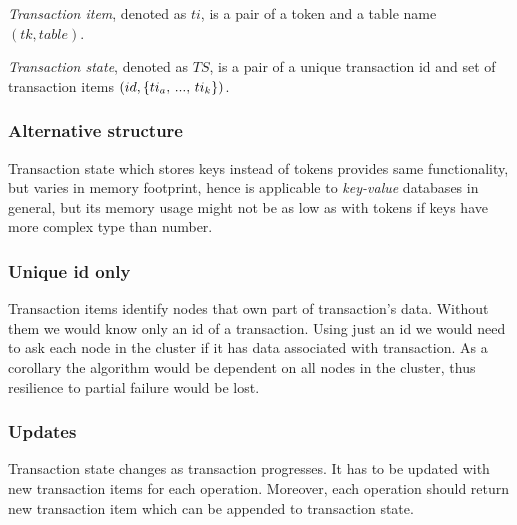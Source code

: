 \begin{definition}
  \label{def:transactionItem}
  \emph{Transaction item}, denoted as $ti$, is a pair of a token and a table name $(tk,table)$.
\end{definition}

\begin{definition}
  \label{def:transactionState}
  \emph{Transaction state}, denoted as $TS$, is a pair of a unique transaction id and set of transaction items $(id, \{ \text{$ti_{a}$, ..., $ti_{k}$} \})$.
\end{definition}

\subsubsection{Alternative structure}
Transaction state which stores keys instead of tokens provides same functionality, but varies in memory footprint, hence \mpt is applicable to \emph{key-value} databases in general, but its memory usage might not be as low as with tokens if keys have more complex type than number.

\subsubsection{Unique id only}
Transaction items identify nodes that own part of transaction's data. Without them we would know only an id of a transaction.
Using just an id we would need to ask each node in the cluster if it has data associated with transaction. As a corollary the algorithm would be dependent on all nodes in the cluster, thus resilience to partial failure would be lost.

\subsubsection{Updates}
Transaction state changes as transaction progresses. It has to be updated with new transaction items for each operation. Moreover, each operation should return new transaction item which can be appended to transaction state. 



